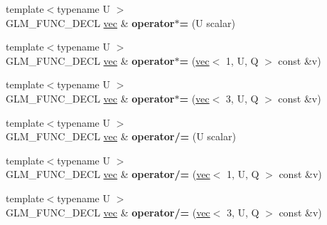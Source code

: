 \begin{DoxyCompactItemize}
\item 
\mbox{\label{structglm_1_1vec_3_013_00_01T_00_01Q_01_4_aba701d21d6bd3d13abf30c01af0578a5}} 
{\footnotesize template$<$typename U $>$ }\\G\+L\+M\+\_\+\+F\+U\+N\+C\+\_\+\+D\+E\+CL \hyperlink{structglm_1_1vec}{vec} \& {\bfseries operator$\ast$=} (U scalar)
\item 
\mbox{\label{structglm_1_1vec_3_013_00_01T_00_01Q_01_4_ab92a53416987503f1fcf90654e0512fd}} 
{\footnotesize template$<$typename U $>$ }\\G\+L\+M\+\_\+\+F\+U\+N\+C\+\_\+\+D\+E\+CL \hyperlink{structglm_1_1vec}{vec} \& {\bfseries operator$\ast$=} (\hyperlink{structglm_1_1vec}{vec}$<$ 1, U, Q $>$ const \&v)
\item 
\mbox{\label{structglm_1_1vec_3_013_00_01T_00_01Q_01_4_a6ac07056cd1518270e77cdcce4fb3fe5}} 
{\footnotesize template$<$typename U $>$ }\\G\+L\+M\+\_\+\+F\+U\+N\+C\+\_\+\+D\+E\+CL \hyperlink{structglm_1_1vec}{vec} \& {\bfseries operator$\ast$=} (\hyperlink{structglm_1_1vec}{vec}$<$ 3, U, Q $>$ const \&v)
\item 
\mbox{\label{structglm_1_1vec_3_013_00_01T_00_01Q_01_4_aa4bc81071af6afd97fa02aabcb50d30a}} 
{\footnotesize template$<$typename U $>$ }\\G\+L\+M\+\_\+\+F\+U\+N\+C\+\_\+\+D\+E\+CL \hyperlink{structglm_1_1vec}{vec} \& {\bfseries operator/=} (U scalar)
\item 
\mbox{\label{structglm_1_1vec_3_013_00_01T_00_01Q_01_4_a99545518c14ab942bec2a08acd578352}} 
{\footnotesize template$<$typename U $>$ }\\G\+L\+M\+\_\+\+F\+U\+N\+C\+\_\+\+D\+E\+CL \hyperlink{structglm_1_1vec}{vec} \& {\bfseries operator/=} (\hyperlink{structglm_1_1vec}{vec}$<$ 1, U, Q $>$ const \&v)
\item 
\mbox{\label{structglm_1_1vec_3_013_00_01T_00_01Q_01_4_ab0b3e69d8f5ae4e3a43203c29c1b9918}} 
{\footnotesize template$<$typename U $>$ }\\G\+L\+M\+\_\+\+F\+U\+N\+C\+\_\+\+D\+E\+CL \hyperlink{structglm_1_1vec}{vec} \& {\bfseries operator/=} (\hyperlink{structglm_1_1vec}{vec}$<$ 3, U, Q $>$ const \&v)

\end{DoxyCompactItemize}
